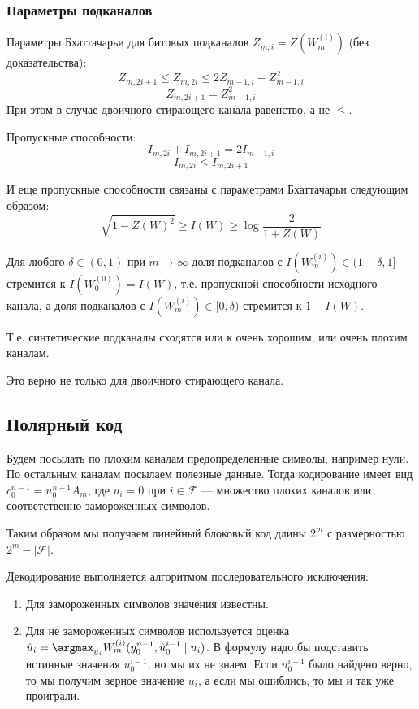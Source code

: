 \subsubsection{Параметры подканалов}

Параметры Бхаттачарьи для битовых подканалов \(Z_{m,i} = Z(W_m^{(i)})\) (без доказательства):
\[Z_{m,2i + 1} \leq Z_{m,2i} \leq 2Z_{m - 1,i} - Z_{m - 1,i}^2\]
\[Z_{m, 2i + 1} = Z_{m - 1,i}^2\]
При этом в случае двоичного стирающего канала равенство, а не \( \leq\).

Пропускные способности:
\[I_{m,2i} + I_{m, 2i + 1} = 2I_{m - 1,i}\]
\[I_{m, 2i} \leq I_{m, 2i + 1}\]

И еще пропускные способности связаны с параметрами Бхаттачарьи следующим образом:
\[\sqrt{1 - Z(W)^2} \geq I(W) \geq \log \frac{2}{1 + Z(W)}\]

\begin{theorem}
    Для любого \(\delta \in (0, 1)\) при \(m \to \infty\) доля подканалов с
    \(I(W_m^{(i)}) \in (1 - \delta, 1]\) стремится к \(I(W_0^{(0)}) = I(W)\),
    т.е. пропускной способности исходного канала,
    а доля подканалов с \(I(W_m^{(i)}) \in [0, \delta)\) стремится к \(1 - I(W)\).

    Т.е. синтетические подканалы сходятся или к очень хорошим, или очень плохим каналам.

    Это верно не только для двоичного стирающего канала.
\end{theorem}

\subsection{Полярный код}

Будем посылать по плохим каналам предопределенные символы, например нули.
По остальным каналам посылаем полезные данные.
Тогда кодирование имеет вид \(c_0^{n - 1} = u^{n-1}_0 A_m\), где \(u_i = 0\) при \(i \in \mathcal{F}\)
--- множество плохих каналов или соответственно замороженных символов.

Таким образом мы получаем линейный блоковый код длины \(2^m\) с размерностью \(2^m - |\mathcal{F}|\).

Декодирование выполняется алгоритмом последовательного исключения:
\begin{enumerate}
    \item Для замороженных символов значения известны.
    \item Для не замороженных символов используется оценка
    \(\hat{u}_i = \argmax_{u_i} W_m^{(i)}(y^{n-1}_0, \hat{u}^{i-1}_0 \mid u_i)\).
    В формулу надо бы подставить истинные значения \(u^{i-1}_0\), но мы их не знаем.
    Если \(u^{i-1}_0\) было найдено верно, то мы получим верное значение \(u_i\),
    а если мы ошиблись, то мы и так уже проиграли.
\end{enumerate}

